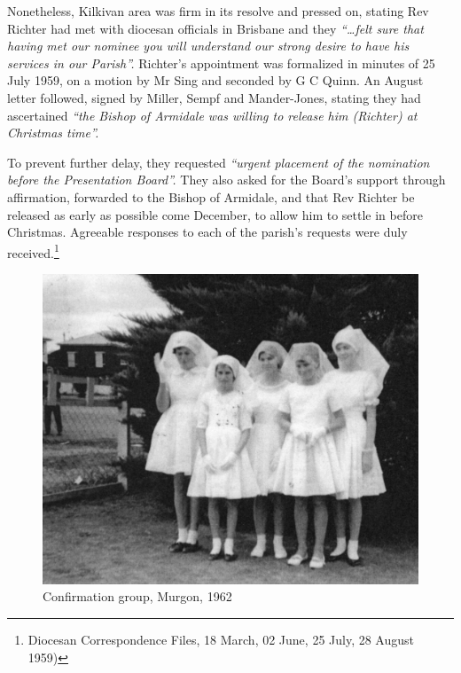 Nonetheless, Kilkivan area was firm in its resolve and pressed on, stating Rev Richter had met with diocesan officials in Brisbane and they \emph{``\ldots felt sure that having met our nominee you will understand our strong desire to have his services in our Parish''.} Richter's appointment was formalized in minutes of 25 July 1959, on a motion by Mr Sing and seconded by G C Quinn. An August letter followed, signed by Miller, Sempf and Mander-Jones, stating they had ascertained \emph{``the Bishop of Armidale was willing to release him (Richter) at Christmas time''.}



To prevent further delay, they requested \emph{``urgent placement of the nomination before the Presentation Board''.} They also asked for the Board's support through affirmation, forwarded to the Bishop of Armidale, and that Rev Richter be released as early as possible come December, to allow him to settle in before Christmas. Agreeable responses to each of the parish's requests were duly received.\footnote{Diocesan Correspondence Files, 18 March, 02 June, 25 July, 28 August 1959)}








\begin{figure}
\begin{center}
\includegraphics[width=1.\linewidth,center]{../images/confirmation1962.jpg}
\caption{Confirmation group, Murgon, 1962}
\end{center}
\end{figure}





